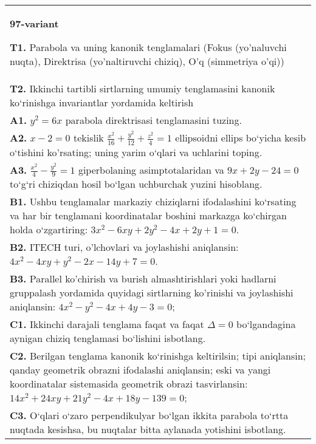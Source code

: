 \documentclass{article}
\begin{document}
\begin{tabular}{m{17cm}}
\textbf{97-variant}
\newline

\textbf{T1.} Parabola va uning kanonik tenglamalari (Fokus (yo’naluvchi nuqta), Direktrisa (yo’naltiruvchi chiziq), O’q (simmetriya o’qi)) \\
\textbf{T2.} Ikkinchi tartibli sirtlarning umumiy tenglamasini kanonik ko‘rinishga invariantlar yordamida keltirish \\
\textbf{A1.} $y^2=6 x$ parabola direktrisasi tenglamasini tuzing. \\
\textbf{A2.} $x-2=0$ tekislik $\frac{x^2}{16}+\frac{y^2}{12}+\frac{z^2}{4}=1$ ellipsoidni ellips bo‘yicha kesib o‘tishini ko'rsating; uning yarim o‘qlari va uchlarini toping. \\
\textbf{A3.} $\frac{x^2}{4}-\frac{y^2}{9}=1$ giperbolaning asimptotalaridan va $9 x+2 y-24=0$ to‘g‘ri chiziqdan hosil bo‘lgan uchburchak yuzini hisoblang. \\
\textbf{B1.} Ushbu tenglamalar markaziy chiziqlarni ifodalashini ko‘rsating va har bir tenglamani koordinatalar boshini markazga ko‘chirgan holda o‘zgartiring: $3x^2-6xy+2y^2-4x+2y+1=0$. \\
\textbf{B2.} ITECH turi, o'lchovlari va joylashishi aniqlansin: $4 x^2-4 x y+y^2-2 x-14 y+7=0$. \\
\textbf{B3.} Parallel ko'chirish va burish almashtirishlari yoki hadlarni gruppalash yordamida quyidagi sirtlarning ko'rinishi va joylashishi aniqlansin: $4 x^2-y^2-4 x+4 y-3=0$; \\
\textbf{C1.} Ikkinchi darajali tenglama faqat va faqat $\Delta=0$ bo‘lgandagina aynigan chiziq tenglamasi bo‘lishini isbotlang. \\
\textbf{C2.} Berilgan tenglama kanonik ko‘rinishga keltirilsin; tipi aniqlansin; qanday geometrik obrazni ifodalashi aniqlansin; eski va yangi koordinatalar sistemasida geometrik obrazi tasvirlansin: $14 x^2+24 x y+21 y^2-4 x+18 y-139=0$; \\
\textbf{C3.} O‘qlari o‘zaro perpendikulyar bo‘lgan ikkita parabola to‘rtta nuqtada kesishsa, bu nuqtalar bitta aylanada yotishini isbotlang. \\

\end{tabular}
\vspace{1cm}
\end{document}
